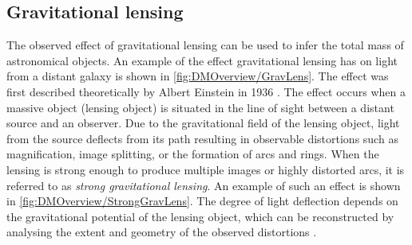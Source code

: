 \subsection{Gravitational lensing}\label{sec:DMOverview/GravLens}
The observed effect of gravitational lensing can be used to infer the total mass of astronomical objects. An example of the effect gravitational lensing has on light from a distant galaxy is shown in \autoref{fig:DMOverview/GravLens}. The effect was first described theoretically by Albert Einstein in 1936 \cite{GravLens}. The effect occurs when a massive object (lensing object) is situated in the line of sight between a distant source and an observer. Due to the gravitational field of the lensing object, light from the source deflects from its path resulting in observable distortions such as magnification, image splitting, or the formation of arcs and rings.
When the lensing is strong enough to produce multiple images or highly distorted arcs, it is referred to as \textit{strong gravitational lensing}. An example of such an effect is shown in \autoref{fig:DMOverview/StrongGravLens}. The degree of light deflection depends on the gravitational potential of the lensing object, which can be reconstructed by analysing the extent and geometry of the observed distortions \cite{Young2016}.

